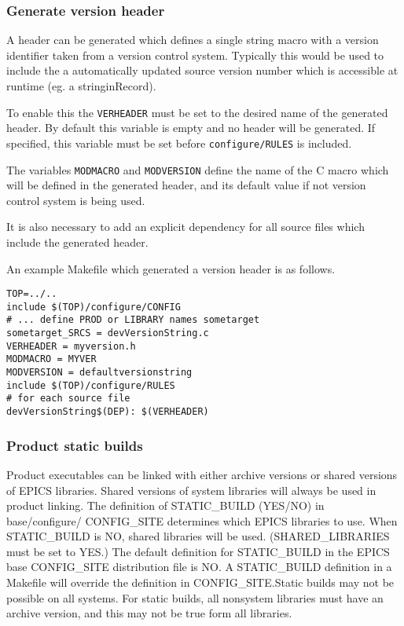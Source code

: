 \subsubsection{Generate version header}

A header can be generated which defines a single string macro with a version identifier
taken from a version control system.
Typically this would be used to include the a automatically updated source version number
which is accessible at runtime (eg. a stringinRecord).

To enable this the \verb|VERHEADER| must be set to the desired name of the generated header.
By default this variable is empty and no header will be generated.
If specified, this variable must be set before \verb|configure/RULES| is included.

The variables \index{}\verb|MODMACRO| and \index{}\verb|MODVERSION| define the name of the C macro which will be defined in the generated header, and its default value if not version control system is being used.

It is also necessary to add an explicit dependency for all source files which include the generated header.

An example Makefile which generated a version header is as follows.

\begin{verbatim}
TOP=../..
include $(TOP)/configure/CONFIG
# ... define PROD or LIBRARY names sometarget
sometarget_SRCS = devVersionString.c
VERHEADER = myversion.h
MODMACRO = MYVER
MODVERSION = defaultversionstring
include $(TOP)/configure/RULES
# for each source file
devVersionString$(DEP): $(VERHEADER)
\end{verbatim}

\subsubsection{Product static builds}

Product executables can be linked with either archive versions or shared versions of EPICS libraries. Shared versions of 
system libraries will always be used in product linking. The definition of STATIC\_BUILD (YES/NO) in base/configure/
CONFIG\_SITE determines which EPICS libraries to use. When STATIC\_BUILD is NO, shared libraries will be used.  
(SHARED\_LIBRARIES must be set to YES.) The default definition for STATIC\_BUILD in the EPICS base 
CONFIG\_SITE distribution file is NO. A STATIC\_BUILD definition in a Makefile will override the definition in 
CONFIG\_SITE.Static builds may not be possible on all systems. For static builds, all nonsystem libraries must have an 
archive version, and this may not be true form all libraries.

